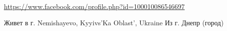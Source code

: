  
 
 
 
 

\url{https://www.facebook.com/profile.php?id=100010086546697}\par
Живет в г. Nemishayevo, Kyyivs'Ka Oblast', Ukraine
Из г. Днепр (город)

